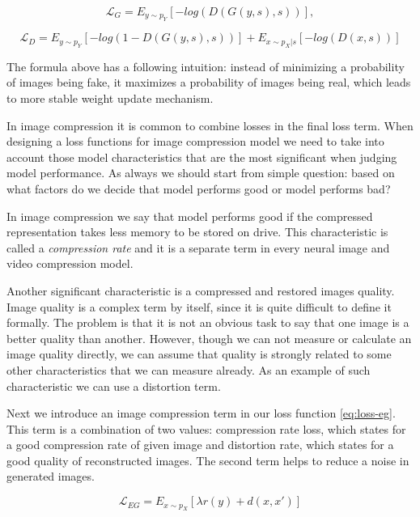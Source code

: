 \begin{equation}
    \label{eq:loss-g}
    \mathcal{L}_G=E_{y\sim p_Y}[-log(D(G(y,s),s))],
\end{equation}

\begin{equation}
    \label{eq:loss-d}
    \mathcal{L}_D=E_{y\sim p_Y}[-log(1-D(G(y,s),s))]+E_{x\sim p_X|s}[-log(D(x,s))]
\end{equation}

The formula above has a following intuition: instead of minimizing a probability of images being fake, it maximizes a probability of images being real, which leads to more stable weight update mechanism.

In image compression it is common to combine losses in the final loss term. When designing a loss functions for image compression model we need to take into account those model characteristics that are the most significant when judging model performance. As always we should start from simple question: based on what factors do we decide that model performs good or model performs bad?

In image compression we say that model performs good if the compressed representation takes less memory to be stored on drive. This characteristic is called a \textit{compression rate} and it is a separate term in every neural image and video compression model.

Another significant characteristic is a compressed and restored images quality. Image quality is a complex term by itself, since it is quite difficult to define it formally. The problem is that it is not an obvious task to say that one image is a better quality than another. However, though we can not measure or calculate an image quality directly, we can assume that quality is strongly related to some other characteristics that we can measure already. As an example of such characteristic we can use a distortion term.

Next we introduce an image compression term in our loss function \ref{eq:loss-eg}. This term is a combination of two values: compression rate loss, which states for a good compression rate of given image and distortion rate, which states for a good quality of reconstructed images. The second term helps to reduce a noise in generated images.

\begin{equation}
    \label{eq:loss-eg}
    \mathcal{L}_{EG}=E_{x\sim p_X}[\lambda r(y)+d(x, x')]
\end{equation}

